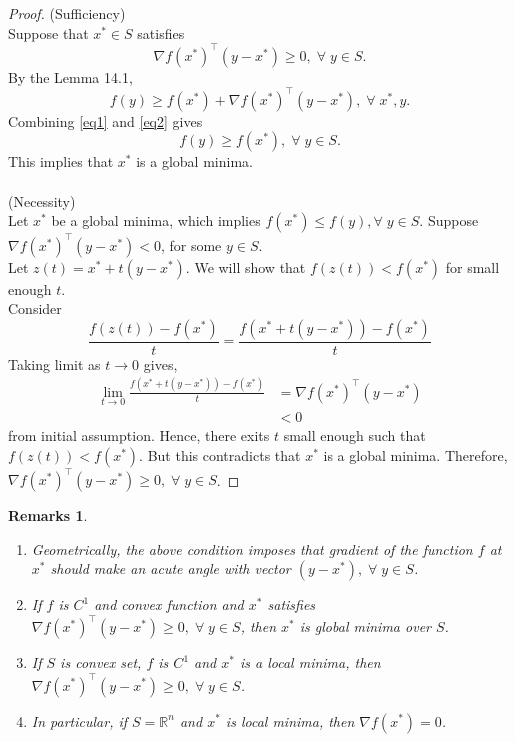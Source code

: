 \documentclass[twoside]{article}
\newtheorem*{remark}{Remarks}
\begin{document}
\begin{proof}
(Sufficiency)\\
Suppose that $x^{*} \in S$ satisfies
\begin{equation}\label{eq1}
    \nabla f(x^{*})^\top(y-x^{*}) \geqslant 0,  \; \forall \;  y \in S.
\end{equation}
By the Lemma 14.1,
\begin{equation}\label{eq2}
    f(y) \geqslant f(x^{*})+\nabla f(x^{*})^\top(y-x^{*}), \; \forall \;  x^{*},y.
\end{equation}
Combining \eqref{eq1} and \eqref{eq2} gives
\begin{equation}\label{eq3}
    f(y) \geqslant f(x^{*}),  \; \forall \; y \in S.
\end{equation}
This implies that $x^{*}$ is a global minima.\\\\
(Necessity)\\
Let $x^{*}$ be a global minima, which implies $f(x^{*}) \leqslant f(y), \forall \; y \in S$. Suppose $\nabla f(x^{*})^{\top}(y-x^{*}) < 0$, for some $y \in S$.\\
Let $z(t)=x^{*}+t(y-x^{*})$. We will show that $f(z(t))<f(x^{*})$ for small enough $t$.\\
Consider\\
\begin{equation}\label{eq4}
\frac{f(z(t))-f(x^{*})}{t} = \frac{f(x^{*}+t(y-x^{*}))-f(x^{*})}{t}
\end{equation}
Taking limit as $t \rightarrow 0$ gives,
\begin{equation}\label{eq5}
\begin{split}
\lim_{t\to 0}\frac{f(x^{*}+t(y-x^{*}))-f(x^{*})}{t} &= \nabla f(x^{*})^{\top}(y-x^{*})\\
&< 0
\end{split}
\end{equation}
from initial assumption. Hence, there exits $t$ small enough such that $f(z(t))<f(x^{*})$. But this contradicts that $x^{*}$ is a global minima.
Therefore, $\nabla f(x^{*})^{\top}(y-x^{*}) \geqslant 0,  \; \forall \; y \in S$.
\end{proof}

\begin{remark}
~\begin{enumerate}
  \item Geometrically, the above condition imposes that gradient of the function $f$ at $x^{*}$ should make an acute angle with vector $(y-x^{*}), \; \forall \; y \in S$.
  \item If $f$ is $C^{1}$ and convex function and $x^{*}$ satisfies $\nabla f(x^{*})^{\top}(y-x^{*}) \geqslant 0,  \; \forall \; y \in S$, then $x^{*}$ is global minima over $S$.
  \item If $S$ is convex set, $f$ is $C^{1}$ and $x^{*}$ is a local minima, then $\nabla f(x^{*})^{\top}(y-x^{*}) \geqslant 0,  \; \forall \;y \in S$.
  \item In particular, if $S=\mathbb{R}^{n}$ and $x^{*}$ is local minima, then $\nabla f(x^{*})=0$.
\end{enumerate}
\end{remark}
\end{document}
